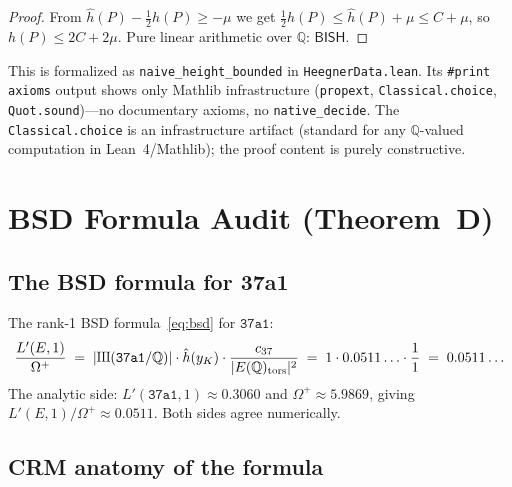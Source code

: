 \documentclass[11pt]{article}
\theoremstyle{plain}
\theoremstyle{definition}
\theoremstyle{remark}
\newcommand{\Q}{\mathbb{Q}}
\newcommand{\Sha}{\text{\raisebox{0.05ex}{\scalebox{0.85}[1]{III}}}}
\newcommand{\BISH}{\ensuremath{\mathsf{BISH}}}
\newcommand{\hhat}{\hat{h}}
\begin{document}
\begin{proof}
From $\hhat(P) - \tfrac{1}{2}h(P) \geq -\mu$ we get $\tfrac{1}{2}h(P) \leq \hhat(P) + \mu \leq C + \mu$, so $h(P) \leq 2C + 2\mu$. Pure linear arithmetic over $\Q$: $\BISH$.
\end{proof}

This is formalized as \texttt{naive\_height\_bounded} in \texttt{HeegnerData.lean}. Its \texttt{\#print axioms} output shows only Mathlib infrastructure (\texttt{propext}, \texttt{Classical.choice}, \texttt{Quot.sound})---no documentary axioms, no \texttt{native\_decide}. The \texttt{Classical.choice} is an infrastructure artifact (standard for any $\Q$-valued computation in Lean~4/Mathlib); the proof content is purely constructive.


\section{BSD Formula Audit (Theorem~D)}
\label{sec:bsd-audit}

\subsection{The BSD formula for 37a1}

The rank-1 BSD formula~\eqref{eq:bsd} for $\texttt{37a1}$:
\[
\frac{L'(E,1)}{\Omega^+} \;=\; |\Sha(\texttt{37a1}/\Q)| \cdot \hhat(y_K) \cdot \frac{c_{37}}{|E(\Q)_{\mathrm{tors}}|^2} \;=\; 1 \cdot 0.0511\ldots \cdot \frac{1}{1} \;=\; 0.0511\ldots
\]
The analytic side: $L'(\texttt{37a1}, 1) \approx 0.3060$ and $\Omega^+ \approx 5.9869$, giving $L'(E,1)/\Omega^+ \approx 0.0511$. Both sides agree numerically.

\subsection{CRM anatomy of the formula}
\end{document}
